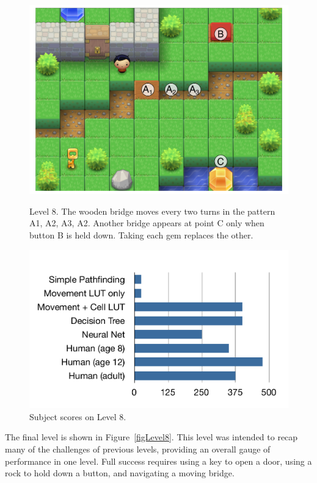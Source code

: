 \documentclass{article}
\begin{document}
\begin{figure}[ht]
\begin{minipage}[t]{0.45\linewidth}
\centering
\includegraphics[width=\textwidth]{figLevel8.pdf}
\caption{Level 8. The wooden bridge moves every two turns in the pattern A1, A2, A3, A2.  Another bridge appears at point C only when button B is held down.  Taking each gem replaces the other.}
\label{figLevel8}
\end{minipage}
\hspace{0.5cm}
\begin{minipage}[b]{0.45\linewidth}
\centering
\includegraphics[width=\textwidth]{figScores8.pdf}
\caption{Subject scores on Level 8.}
\label{figScores8}
\end{minipage}
\end{figure}

The final level is shown in Figure~\ref{figLevel8}.  This level was intended to recap many of the challenges of previous levels, providing an overall gauge of performance in one level.  Full success requires using a key to open a door, using a rock to hold down a button, and navigating a moving bridge.
\end{document}
